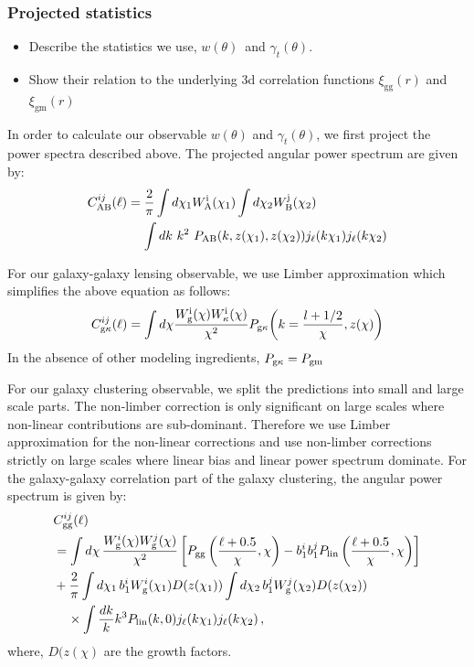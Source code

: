 \documentclass[fleqn,usenatbib]{mnras}
\newcommand{\gammat}{\ensuremath{\gamma_{t}(\theta)}}
\newcommand{\wtheta}{\ensuremath{w(\theta)}}
\newcommand{\xigg}{\ensuremath{\xi_{\mathrm{gg}}} }
\newcommand{\xigm}{\ensuremath{\xi_{\mathrm{gm}}} }
\begin{document}
\subsubsection{Projected statistics}
\label{sec:proj_2pt}
\begin{itemize}
    \item Describe the statistics we use, \wtheta\ and \gammat.
    \item Show their relation to the underlying 3d correlation functions $\xigg(r)$ and $\xigm(r)$
\end{itemize}

In order to calculate our observable $\wtheta$ and $\gammat$, we first project the power spectra described above. The projected angular power spectrum are given by:
\begin{align}
    C^{ij}_{\rm AB}(\ell) &= \frac{2}{\pi} \int d\chi_1 W^{\rm i}_{\rm A}(\chi_1) \int d\chi_2 W^{\rm j}_{\rm B}(\chi_2) \nonumber \\
    &\mathrel{\phantom{=}} \int dk \ k^2 \ P_{\rm AB}(k,z(\chi_1),z(\chi_2)) j_{\ell}(k \chi_1) j_{\ell}(k \chi_2)
\end{align}

For our galaxy-galaxy lensing observable, we use Limber approximation which simplifies the above equation as follows:
\begin{equation}
    C^{ij}_{\rm g\kappa}(\ell)  = \int d\chi \frac{W^{\rm i}_{\rm g}(\chi) W^{\rm i}_{\rm \kappa}(\chi)}{\chi^2} P_{\rm g\kappa}\bigg(k=\frac{l + 1/2}{\chi},z(\chi)\bigg) 
\end{equation}
In the absence of other modeling ingredients, $P_{\rm g\kappa} = P_{\rm gm}$

For our galaxy clustering observable, we split the predictions into small and large scale parts. The non-limber correction is only significant on large scales where non-linear contributions are sub-dominant. Therefore we use Limber approximation for the non-linear corrections and use non-limber corrections strictly on large scales where linear bias and linear power spectrum dominate. For the galaxy-galaxy correlation part of the galaxy clustering, the angular power spectrum is given by:
\begin{align}
    &C_{\rm gg}^{ij} (\ell) \nonumber\\
    &= \int d\chi\, \frac{W_{\rm g}^i(\chi)W_{\rm g}^j(\chi)}{\chi^2} \left[P_{\rm gg}\left(\frac{\ell+0.5}{\chi},\chi\right)- b_1^{i} b_1^{j} P_{\rm lin}\left(\frac{\ell+0.5}{\chi},\chi\right)\right]\nonumber\\
    &+\frac{2}{\pi}\int d\chi_1\,b_{1}^i W_{\rm g}^i(\chi_1) D(z(\chi_1))\int d\chi_2\,b_{1}^j W_{\rm g}^j(\chi_2)D(z(\chi_2))\nonumber\\
    &\;\;\;\;\times \int\frac{dk}{k}k^3 P_{\rm lin}(k,0)j_\ell(k\chi_1)j_\ell(k\chi_2)\,,
\label{eq:Cl-DD_rewrite}
\end{align}
where, $D(z(\chi)$ are the growth factors. 
\end{document}
